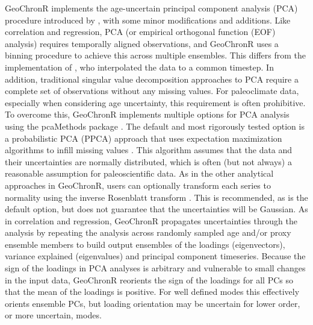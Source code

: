 \documentclass[gchron, manuscript]{copernicus}
\begin{document}
GeoChronR implements the age-uncertain principal component analysis (PCA) procedure introduced by \citet{anchukaitis2013mceof}, with some minor modifications and additions.
Like correlation and regression, PCA (or empirical orthogonal function (EOF) analysis) requires temporally aligned observations, and GeoChronR uses a binning procedure to achieve this across multiple ensembles.
This differs from the implementation of \citet{anchukaitis2013mceof}, who interpolated the data to a common timestep.
In addition, traditional singular value decomposition approaches to PCA require a complete set of observations without any missing values.
For paleoclimate data, especially when considering age uncertainty, this requirement is often prohibitive.
To overcome this, GeoChronR implements multiple options for PCA analysis using the pcaMethods package \citep{pcaMethods}.
The default and most rigorously tested option is a probabilistic PCA (PPCA) approach that uses expectation maximization algorithms to infill missing values \citep{roweis1998algorithms}.
This algorithm assumes that the data and their uncertainties are normally distributed, which is often (but not always) a reasonable assumption for paleoscientific data.
As in the other analytical approaches in GeoChronR, users can optionally transform each series to normality using the inverse Rosenblatt transform \citep{vanAlbada2007}.
This is recommended, as is the default option, but does not guarantee that the uncertainties will be Gaussian.
As in correlation and regression, GeoChronR propagates uncertainties through the analysis by repeating the analysis across randomly sampled age and/or proxy ensemble members to build output ensembles of the loadings (eigenvectors), variance explained (eigenvalues) and principal component timeseries.
Because the sign of the loadings in PCA analyses is arbitrary and vulnerable to small changes in the input data, GeoChronR reorients the sign of the loadings for all PCs so that the mean of the loadings is positive.
For well defined modes this effectively orients ensemble PCs, but loading orientation may be uncertain for lower order, or more uncertain, modes.
\end{document}
